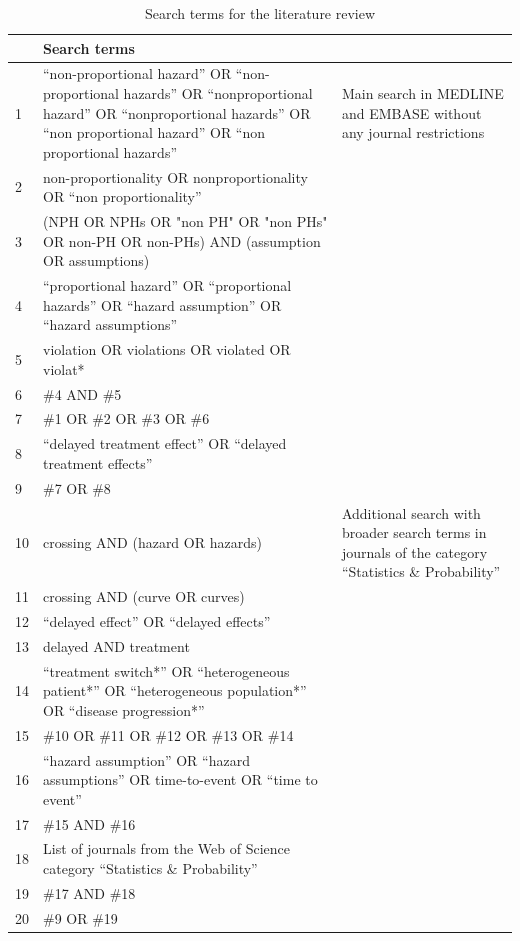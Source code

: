 \begin{table}[hb!]
\caption{Search terms for the literature review} 
\label{tab:Table3}
\begin{tabular}{|p{0.2in}|p{2.8in}|p{1.5in}|}
\hline 
& Search terms &   \\ \hline 
1 & ``non-proportional hazard'' OR ``non-proportional hazards'' OR ``nonproportional hazard'' OR ``nonproportional hazards'' OR ``non proportional hazard'' OR ``non proportional hazards'' & Main search in MEDLINE and EMBASE without any journal restrictions \\ \hline 
2 & non-proportionality OR nonproportionality OR ``non proportionality'' &  \\ \hline 
3 & (NPH OR NPHs OR "non PH" OR "non PHs" OR non-PH OR non-PHs) AND (assumption OR assumptions) &  \\ \hline 
4 & ``proportional hazard'' OR ``proportional hazards'' OR ``hazard assumption'' OR ``hazard assumptions'' &  \\ \hline 
5 & violation OR violations OR violated OR violat* &  \\ \hline 
6 & \#4 AND \#5 &  \\ \hline 
7 & \#1 OR \#2 OR \#3 OR \#6 &  \\ \hline 
8 & ``delayed treatment effect'' OR ``delayed treatment effects'' &  \\ \hline 
9 & \#7 OR \#8 &  \\ \hline 
10 & crossing AND (hazard OR hazards) & Additional search with broader search terms in journals of the category ``Statistics \&  Probability'' \\ \hline 
11 & crossing AND (curve OR curves) &  \\ \hline 
12 & ``delayed effect'' OR ``delayed effects'' &  \\ \hline 
13 & delayed AND treatment &  \\ \hline 
14 & ``treatment switch*'' OR ``heterogeneous patient*'' OR ``heterogeneous population*'' OR ``disease progression*'' &  \\ \hline 
15 & \#10 OR \#11 OR \#12 OR \#13 OR \#14 &  \\ \hline 
16 & ``hazard assumption'' OR ``hazard assumptions'' OR time-to-event OR ``time to event'' &  \\ \hline 
17 & \#15 AND \#16 &  \\ \hline 
18 & List of journals from the Web of Science category ``Statistics \& Probability'' &  \\ \hline 
19 & \#17 AND \#18 &  \\ \hline 
20 & \#9 OR \#19                                            &   \\ \hline 
\end{tabular}
\end{table}

